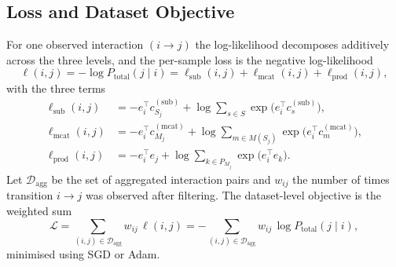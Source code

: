 \subsection{Loss and Dataset Objective}
For one observed interaction $(i\to j)$ the log-likelihood decomposes additively
across the three levels, and the per-sample loss is the negative log-likelihood
\begin{equation}
  \label{eq:emb-loss}
  \ell(i,j) = -\log P_{\text{total}}(j\mid i)
            = \ell_{\text{sub}}(i,j) + \ell_{\text{mcat}}(i,j)
              + \ell_{\text{prod}}(i,j),
\end{equation}
with the three terms
\begin{align}
  \ell_{\text{sub}}(i,j)  &= -e_i^\top c^{(\text{sub})}_{S_j}
     + \log\!\sum_{s\in S}\exp\!\big(e_i^\top c^{(\text{sub})}_{s}\big),
     \label{eq:emb-lsub}\\
  \ell_{\text{mcat}}(i,j) &= -e_i^\top c^{(\text{mcat})}_{M_j}
     + \log\!\sum_{m\in M(S_j)}\exp\!\big(e_i^\top c^{(\text{mcat})}_{m}\big),
     \label{eq:emb-lmcat}\\
  \ell_{\text{prod}}(i,j) &= -e_i^\top e_j
     + \log\!\sum_{k\in P_{M_j}}\exp\!\big(e_i^\top e_k\big).
     \label{eq:emb-lprod}
\end{align}
Let $\mathcal{D}_{\text{agg}}$ be the set of aggregated interaction pairs and
$w_{ij}$ the number of times transition $i\to j$ was observed after filtering.
The dataset-level objective is the weighted sum
\begin{equation}
  \label{eq:emb-objective}
  \mathcal{L}
    = \sum_{(i,j)\in\mathcal{D}_{\text{agg}}} w_{ij}\,\ell(i,j)
    = -\sum_{(i,j)\in\mathcal{D}_{\text{agg}}} w_{ij}\,
        \log P_{\text{total}}(j\mid i),
\end{equation}
minimised using SGD or Adam.

